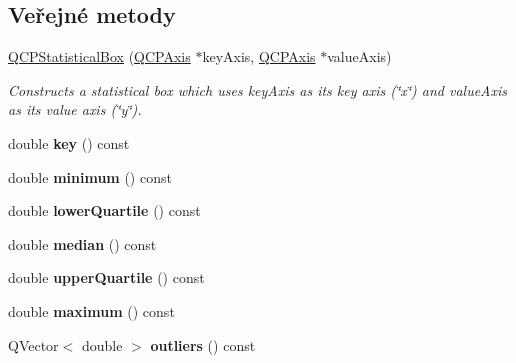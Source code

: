 \subsection*{Veřejné metody}
\begin{DoxyCompactItemize}
\item 
\hyperlink{classQCPStatisticalBox_a75c2b3e7fcd0741cc981693a2ba63b27}{Q\+C\+P\+Statistical\+Box} (\hyperlink{classQCPAxis}{Q\+C\+P\+Axis} $\ast$key\+Axis, \hyperlink{classQCPAxis}{Q\+C\+P\+Axis} $\ast$value\+Axis)
\begin{DoxyCompactList}\small\item\em Constructs a statistical box which uses {\itshape key\+Axis} as its key axis (\char`\"{}x\char`\"{}) and {\itshape value\+Axis} as its value axis (\char`\"{}y\char`\"{}). \end{DoxyCompactList}\item 
\hypertarget{classQCPStatisticalBox_a767af754f39872d6308b900a0d1758ca}{}double {\bfseries key} () const \label{classQCPStatisticalBox_a767af754f39872d6308b900a0d1758ca}

\item 
\hypertarget{classQCPStatisticalBox_acd94c05d59c05d9146d3b60d9f52df82}{}double {\bfseries minimum} () const \label{classQCPStatisticalBox_acd94c05d59c05d9146d3b60d9f52df82}

\item 
\hypertarget{classQCPStatisticalBox_af9c4a98f5ca95b5a5a8b140f57b64ace}{}double {\bfseries lower\+Quartile} () const \label{classQCPStatisticalBox_af9c4a98f5ca95b5a5a8b140f57b64ace}

\item 
\hypertarget{classQCPStatisticalBox_a44abdee617fe0bca72e6a2ea3fd492de}{}double {\bfseries median} () const \label{classQCPStatisticalBox_a44abdee617fe0bca72e6a2ea3fd492de}

\item 
\hypertarget{classQCPStatisticalBox_abd15951907b54343a89b1f7feddcb7a7}{}double {\bfseries upper\+Quartile} () const \label{classQCPStatisticalBox_abd15951907b54343a89b1f7feddcb7a7}

\item 
\hypertarget{classQCPStatisticalBox_a928bcf07dd2176affad91d85be03172f}{}double {\bfseries maximum} () const \label{classQCPStatisticalBox_a928bcf07dd2176affad91d85be03172f}

\item 
\hypertarget{classQCPStatisticalBox_a73eaa2f800b47e3832d7f09ad1f3b7e0}{}Q\+Vector$<$ double $>$ {\bfseries outliers} () const \label{classQCPStatisticalBox_a73eaa2f800b47e3832d7f09ad1f3b7e0}


\end{DoxyCompactItemize}

